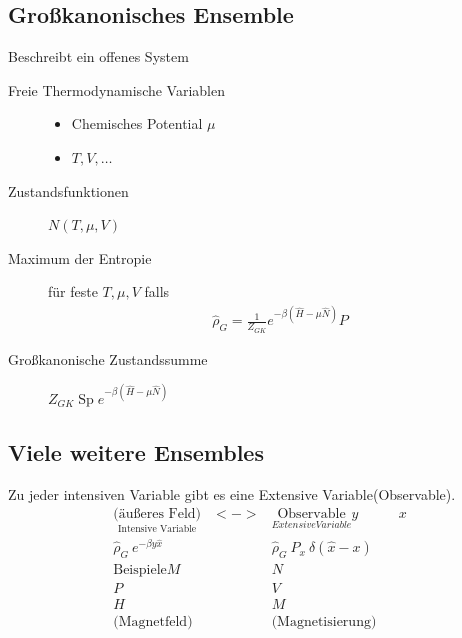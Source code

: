 \documentclass[11pt]{article}
\theoremstyle{plain}
\begin{document}
\subsection*{Gro\ss{}kanonisches Ensemble}
Beschreibt ein offenes System
\begin{description}
  \item[Freie Thermodynamische Variablen] 
    \begin{itemize}
      \item Chemisches Potential $\mu$
      \item $T, V, \ldots$
    \end{itemize}
  \item[Zustandsfunktionen] $N(T, \mu, V)$
  \item[Maximum der Entropie] f\"ur feste $T, \mu, V$ falls
    \begin{align*}
      \hat{\rho}_G = \frac{1}{Z_{GK}} e^{-\beta(\hat{H}- \mu \hat{N})} P
    \end{align*}
  \item[Gro\ss{}kanonische Zustandssumme] $Z_{GK} 
    \operatorname{Sp} e^{-\beta(\hat{H}- \mu \hat{N})} $
\end{description}
\subsection*{Viele weitere Ensembles}
Zu jeder intensiven Variable gibt es eine Extensive Variable(Observable).
 \begin{align*}
   \underset{\text{Intensive Variable}}{ \text{(\"au\ss{}eres Feld)}} &<->& 
   \underset{Extensive Variable}{\text{Observable}}
   y && x \\
   \hat{\rho}_G ~ e^{- \beta y \hat{x}} && \hat{\rho}_G ~ 
   P_x ~ \delta (\hat{x} -x ) \\
   \text{Beispiele}
   M && N \\
   P && V \\
   H && M \\
   \text{(Magnetfeld)} && \text{(Magnetisierung)} \\
 \end{align*}
 
\end{document}
